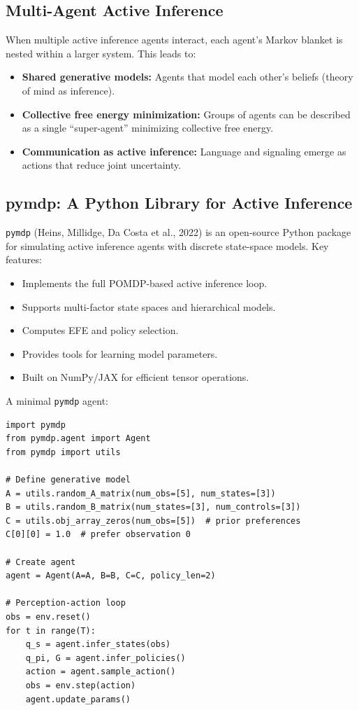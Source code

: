 \documentclass[11pt,a4paper]{article}
\theoremstyle{definition}
\begin{document}
\subsection{Multi-Agent Active Inference}

When multiple active inference agents interact, each agent's Markov blanket
is nested within a larger system.  This leads to:
\begin{itemize}[leftmargin=2em]
  \item \textbf{Shared generative models:} Agents that model each other's
    beliefs (theory of mind as inference).
  \item \textbf{Collective free energy minimization:} Groups of agents can be
    described as a single ``super-agent'' minimizing collective free energy.
  \item \textbf{Communication as active inference:} Language and signaling
    emerge as actions that reduce joint uncertainty.
\end{itemize}

\subsection{pymdp: A Python Library for Active Inference}

\texttt{pymdp} (Heins, Millidge, Da Costa et al., 2022) is an open-source
Python package for simulating active inference agents with discrete state-space
models.  Key features:
\begin{itemize}[leftmargin=2em]
  \item Implements the full POMDP-based active inference loop.
  \item Supports multi-factor state spaces and hierarchical models.
  \item Computes EFE and policy selection.
  \item Provides tools for learning model parameters.
  \item Built on NumPy/JAX for efficient tensor operations.
\end{itemize}

A minimal \texttt{pymdp} agent:
\begin{verbatim}
import pymdp
from pymdp.agent import Agent
from pymdp import utils

# Define generative model
A = utils.random_A_matrix(num_obs=[5], num_states=[3])
B = utils.random_B_matrix(num_states=[3], num_controls=[3])
C = utils.obj_array_zeros(num_obs=[5])  # prior preferences
C[0][0] = 1.0  # prefer observation 0

# Create agent
agent = Agent(A=A, B=B, C=C, policy_len=2)

# Perception-action loop
obs = env.reset()
for t in range(T):
    q_s = agent.infer_states(obs)
    q_pi, G = agent.infer_policies()
    action = agent.sample_action()
    obs = env.step(action)
    agent.update_params()
\end{verbatim}
\end{document}
